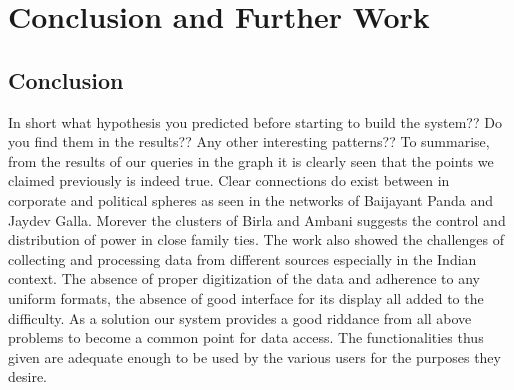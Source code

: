 \chapter{Conclusion and Further Work}
\section{Conclusion}
 In short what hypothesis you predicted before starting to build the system?? Do you find them in the results?? Any other interesting patterns?? 
To summarise, from the results of our queries in the graph it is clearly seen that the points we claimed previously is indeed true. Clear connections do exist between in corporate and political spheres as seen in the networks of Baijayant Panda and Jaydev Galla. Morever the clusters of Birla and Ambani suggests the control and distribution of power in close family ties.  
The work also showed the challenges of collecting and processing data from different sources especially in the Indian context. The absence of proper digitization of the data and adherence to any uniform formats, the absence of good interface for its display all added to the difficulty.
As a solution our system provides a good riddance from all above problems to become a common point for data access. The functionalities thus given are adequate enough to be used by the various users for the purposes they desire.

